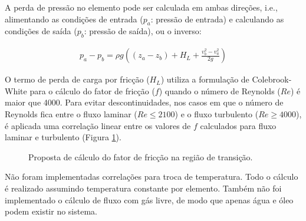 \documentclass[final,5p]{elsarticle}
\numberwithin{equation}{section}
\begin{document}
        A perda de pressão no elemento pode ser calculada em ambas direções, i.e., alimentando as condições de entrada ($p_a$: pressão de entrada) e calculando as condições de saída ($p_b$: pressão de saída), ou o inverso:

        \begin{align}
            p_a - p_b = \rho g \left( (z_a - z_b) + H_L + \frac{v^2_b - v^2_a}{2 g}\right)
        \end{align}

        O termo de perda de carga por fricção ($H_L$) utiliza a formulação de Colebrook-White para o cálculo do fator de fricção ($f$) quando o número de Reynolds ($Re$) é maior que 4000. Para evitar descontinuidades, nos casos em que o número de Reynolds fica entre o fluxo laminar ($Re \leq 2100$) e o fluxo turbulento ($Re \geq 4000$), é aplicada uma correlação linear entre os valores de $f$ calculados para fluxo laminar e turbulento (Figura \ref{fig:friccao}).

        \begin{figure}[hbt!]
            \caption{Proposta de cálculo do fator de fricção na região de transição.}
            \label{fig:friccao}
        \end{figure}

        Não foram implementadas correlações para troca de temperatura. Todo o cálculo é realizado assumindo temperatura constante por elemento. Também não foi implementado o cálculo de fluxo com gás livre, de modo que apenas água e óleo podem existir no sistema.
\end{document}
